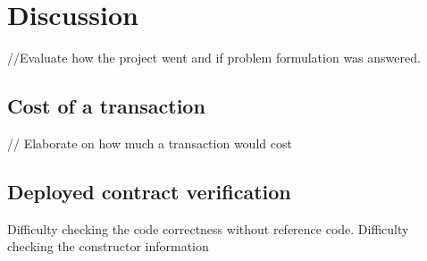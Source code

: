 \section{Discussion}\label{sec:discussion}

//Evaluate how the project went and if problem formulation was answered.

\subsection{Cost of a transaction}

// Elaborate on how much a transaction would cost

\subsection{Deployed contract verification}
Difficulty checking the code correctness without reference code.
Difficulty checking the constructor information